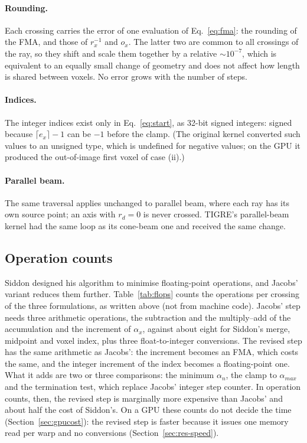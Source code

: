 \documentclass[11pt,a4paper]{article}
\theoremstyle{remark}
\begin{document}
\paragraph{Rounding.} Each crossing carries the error of one evaluation of Eq.~\eqref{eq:fma}: the
rounding of the FMA, and those of $r_x^{-1}$ and $o_x$. The latter two are common to all crossings of the
ray, so they shift and scale them together by a relative $\sim10^{-7}$, which is equivalent to an equally
small change of geometry and does not affect how length is shared between voxels. No error grows with
the number of steps.

\paragraph{Indices.} The integer indices exist only in Eq.~\eqref{eq:start}, as 32-bit signed integers:
signed because $\lceil e_x\rceil-1$ can be $-1$ before the clamp. (The original kernel converted such
values to an unsigned type, which is undefined for negative values; on the GPU it produced the
out-of-image first voxel of case (ii).)

\paragraph{Parallel beam.} The same traversal applies unchanged to parallel beam, where each ray has its
own source point; an axis with $r_d=0$ is never crossed. TIGRE's parallel-beam kernel had the same loop as
its cone-beam one and received the same change.

\subsection{Operation counts}
\label{sec:flops}

Siddon designed his algorithm to minimise floating-point operations, and Jacobs' variant reduces them
further. Table~\ref{tab:flops} counts the operations per crossing of the three formulations, as written
above (not from machine code). Jacobs' step needs three arithmetic operations, the subtraction and the
multiply--add of the accumulation and the increment of $\alpha_x$, against about eight for Siddon's merge,
midpoint and voxel index, plus three float-to-integer conversions. The revised step has the same
arithmetic as Jacobs': the increment becomes an FMA, which costs the same, and the integer increment of the
index becomes a floating-point one. What it adds are two or three comparisons: the minimum $\alpha_n$, the
clamp to $\alpha_{max}$ and the termination test, which replace Jacobs' integer step counter. In operation
counts, then, the revised step is marginally more expensive than Jacobs' and about half the cost of
Siddon's. On a GPU these counts do not decide the time (Section~\ref{sec:gpucost}): the revised step is
faster because it issues one memory read per warp and no conversions (Section~\ref{sec:res-speed}).
\end{document}
